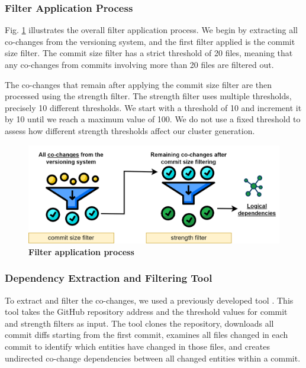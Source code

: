 \documentclass{ieeeaccess}
\begin{document}
\subsubsection{Filter Application Process}

Fig. \ref{fig:filtering} illustrates the overall filter application process. We begin by extracting all co-changes from the versioning system, and the first filter applied is the commit size filter. The commit size filter has a strict threshold of 20 files, meaning that any co-changes from commits involving more than 20 files are filtered out.

The co-changes that remain after applying the commit size filter are then processed using the strength filter. The strength filter uses multiple thresholds, precisely 10 different thresholds. We start with a threshold of 10 and increment it by 10 until we reach a maximum value of 100. We do not use a fixed threshold to assess how different strength thresholds affect our cluster generation.

\begin{figure}[t!]
  \centering
  \includegraphics[width=\columnwidth]{filtering.png}
  \caption{ \textbf{Filter application process}}
  \label{fig:filtering}
\end{figure}

\subsubsection{Dependency Extraction and Filtering Tool}

To extract and filter the co-changes, we used a previously developed tool \cite{b4}. This tool takes the GitHub repository address and the threshold values for commit and strength filters as input. The tool clones the repository, downloads all commit diffs starting from the first commit, examines all files changed in each commit to identify which entities have changed in those files, and creates undirected co-change dependencies between all changed entities within a commit.
\end{document}
